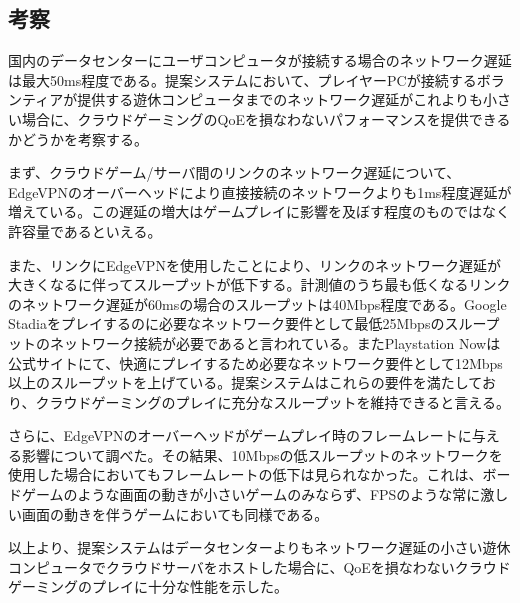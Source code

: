 \subsection{考察}
国内のデータセンターにユーザコンピュータが接続する場合のネットワーク遅延は最大50ms程度である。提案システムにおいて、プレイヤーPCが接続するボランティアが提供する遊休コンピュータまでのネットワーク遅延がこれよりも小さい場合に、クラウドゲーミングのQoEを損なわないパフォーマンスを提供できるかどうかを考察する。

まず、クラウドゲーム/サーバ間のリンクのネットワーク遅延について、EdgeVPNのオーバーヘッドにより直接接続のネットワークよりも1ms程度遅延が増えている。この遅延の増大はゲームプレイに影響を及ぼす程度のものではなく許容量であるといえる。

また、リンクにEdgeVPNを使用したことにより、リンクのネットワーク遅延が大きくなるに伴ってスループットが低下する。計測値のうち最も低くなるリンクのネットワーク遅延が60msの場合のスループットは40Mbps程度である。Google Stadiaをプレイするのに必要なネットワーク要件として最低25Mbpsのスループットのネットワーク接続が必要であると言われている\cite{stadia_band}。またPlaystation Nowは公式サイトにて、快適にプレイするため必要なネットワーク要件として12Mbps以上のスループットを上げている\cite{ps-now}。提案システムはこれらの要件を満たしており、クラウドゲーミングのプレイに充分なスループットを維持できると言える。

さらに、EdgeVPNのオーバーヘッドがゲームプレイ時のフレームレートに与える影響について調べた。その結果、10Mbpsの低スループットのネットワークを使用した場合においてもフレームレートの低下は見られなかった。これは、ボードゲームのような画面の動きが小さいゲームのみならず、FPSのような常に激しい画面の動きを伴うゲームにおいても同様である。

以上より、提案システムはデータセンターよりもネットワーク遅延の小さい遊休コンピュータでクラウドサーバをホストした場合に、QoEを損なわないクラウドゲーミングのプレイに十分な性能を示した。



